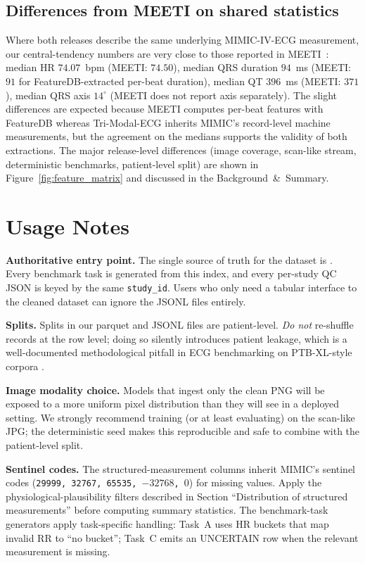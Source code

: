 \documentclass[12pt,letterpaper]{article}
\begin{document}
\subsection*{Differences from MEETI on shared statistics}

Where both releases describe the same underlying MIMIC-IV-ECG measurement, our central-tendency numbers are very close to those reported in MEETI~\cite{zhang2024meeti}: median HR $74.07$~bpm (MEETI: $74.50$), median QRS duration $94$~ms (MEETI: $91$ for FeatureDB-extracted per-beat duration), median QT $396$~ms (MEETI: $371$), median QRS axis $14^\circ$ (MEETI does not report axis separately). The slight differences are expected because MEETI computes per-beat features with FeatureDB whereas Tri-Modal-ECG inherits MIMIC's record-level machine measurements, but the agreement on the medians supports the validity of both extractions. The major release-level differences (image coverage, scan-like stream, deterministic benchmarks, patient-level split) are shown in Figure~\ref{fig:feature_matrix} and discussed in the Background~\&~Summary.

\section*{Usage Notes}

\textbf{Authoritative entry point.} The single source of truth for the dataset is . Every benchmark task is generated from this index, and every per-study QC JSON is keyed by the same \texttt{study\_id}. Users who only need a tabular interface to the cleaned dataset can ignore the JSONL files entirely.

\textbf{Splits.} Splits in our parquet and JSONL files are patient-level. \emph{Do not} re-shuffle records at the row level; doing so silently introduces patient leakage, which is a well-documented methodological pitfall in ECG benchmarking on PTB-XL-style corpora \cite{strodthoff2021deep, ribeiro2020automatic}.

\textbf{Image modality choice.} Models that ingest only the clean PNG will be exposed to a more uniform pixel distribution than they will see in a deployed setting. We strongly recommend training (or at least evaluating) on the scan-like JPG; the deterministic seed makes this reproducible and safe to combine with the patient-level split.

\textbf{Sentinel codes.} The structured-measurement columns inherit MIMIC's sentinel codes (\texttt{29999, 32767, 65535, $-32768$, $0$}) for missing values. Apply the physiological-plausibility filters described in Section ``Distribution of structured measurements'' before computing summary statistics. The benchmark-task generators apply task-specific handling: Task~A uses HR buckets that map invalid RR to ``no bucket''; Task~C emits an UNCERTAIN row when the relevant measurement is missing.
\end{document}
